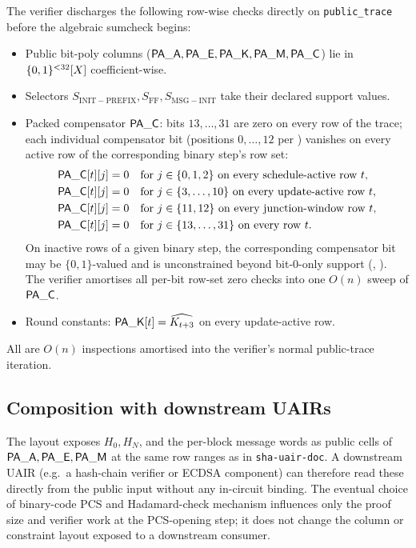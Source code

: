 The verifier discharges the following row-wise checks directly on
\texttt{public\_trace} before the algebraic sumcheck begins:
\begin{itemize}[leftmargin=2em]
  \item Public bit-poly columns ($\mathsf{PA\_A}, \mathsf{PA\_E},
        \mathsf{PA\_K}, \mathsf{PA\_M}, \mathsf{PA\_C}$) lie in $\{0,1\}^{<32}[X]$
        coefficient-wise.
  \item Selectors $S_{\mathrm{INIT-PREFIX}}, S_{\mathrm{FF}},
        S_{\mathrm{MSG-INIT}}$ take their declared support values.
  \item Packed compensator $\mathsf{PA\_C}$: bits $13, \dots, 31$ are
        zero on every row of the trace; each individual compensator
        bit (positions $0, \dots, 12$ per )
        vanishes on every active row of the corresponding binary
        step's row set:
        \begin{align*}
          \mathsf{PA\_C}[t][j] &= 0
            \quad\text{for } j \in \{0, 1, 2\}\
            \text{on every schedule-active row } t, \\
          \mathsf{PA\_C}[t][j] &= 0
            \quad\text{for } j \in \{3, \dots, 10\}\
            \text{on every update-active row } t, \\
          \mathsf{PA\_C}[t][j] &= 0
            \quad\text{for } j \in \{11, 12\}\
            \text{on every junction-window row } t, \\
          \mathsf{PA\_C}[t][j] &= 0
            \quad\text{for } j \in \{13, \dots, 31\}\
            \text{on every row } t.
        \end{align*}
        On inactive rows of a given binary step, the corresponding
        compensator bit may be $\{0,1\}$-valued and is unconstrained
        beyond bit-$0$-only support (,
        ). The verifier amortises all
        per-bit row-set zero checks into one $O(n)$ sweep of
        $\mathsf{PA\_C}$.
  \item Round constants: $\mathsf{PA\_K}[t] = \widehat{K_{t+3}}$ on
        every update-active row.
\end{itemize}
All are $O(n)$ inspections amortised into the verifier's normal
public-trace iteration.

\subsection{Composition with downstream UAIRs}

The layout exposes $H_0, H_N$, and the per-block message words as
public cells of $\mathsf{PA\_A}, \mathsf{PA\_E}, \mathsf{PA\_M}$ at the same row
ranges as in \texttt{sha-uair-doc}. A downstream UAIR (e.g.\ a hash-chain
verifier or ECDSA component) can therefore read these directly from
the public input without any in-circuit binding. The eventual choice
of binary-code PCS and Hadamard-check mechanism influences only the
proof size and verifier work at the PCS-opening step; it does not
change the column or constraint layout exposed to a downstream
consumer.
